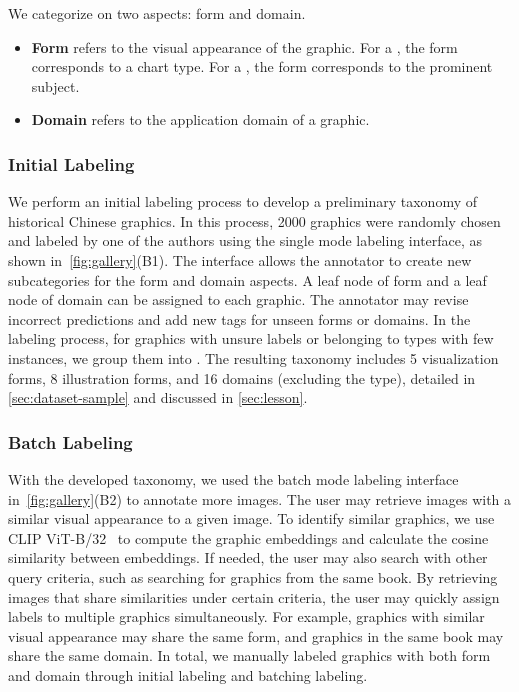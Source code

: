We categorize  on two aspects: form and domain.

\begin{itemize}[leftmargin=3.5mm]
    \item \textbf{Form} refers to the visual appearance of the graphic.
 For a , the form corresponds to a chart type.
 For a , the form corresponds to the prominent subject.
    
    \item \textbf{Domain} refers to the application domain of a graphic.
\end{itemize}

\subsubsection{Initial Labeling}

We perform an initial labeling process to develop a preliminary taxonomy of historical Chinese graphics.
In this process, \num{2000} graphics were randomly chosen and labeled by one of the authors using the single mode labeling interface, as shown in~\cref{fig:gallery}(B1).
The interface allows the annotator to create new subcategories for the form and domain aspects.
A leaf node of form and a leaf node of domain can be assigned to each graphic.
The annotator may revise incorrect predictions and add new tags for unseen forms or domains.
In the labeling process, for graphics with unsure labels or belonging to types with few instances, we group them into .
The resulting taxonomy includes 5 visualization forms, 8 illustration forms, and 16 domains (excluding the  type), detailed in \cref{sec:dataset-sample} and discussed in \cref{sec:lesson}.

\subsubsection{Batch Labeling}

With the developed taxonomy, we used the batch mode labeling interface in~\cref{fig:gallery}(B2) to annotate more images.
The user may retrieve images with a similar visual appearance to a given image.
To identify similar graphics, we use CLIP ViT-B/32~\cite{Radford2021Learning} to compute the graphic embeddings and calculate the cosine similarity between embeddings.
If needed, the user may also search with other query criteria, such as searching for graphics from the same book.
By retrieving images that share similarities under certain criteria, the user may quickly assign labels to multiple graphics simultaneously.
For example, graphics with similar visual appearance may share the same form, and graphics in the same book may share the same domain. 
In total, we manually labeled \numChecked graphics with both form and domain through initial labeling and batching labeling.

